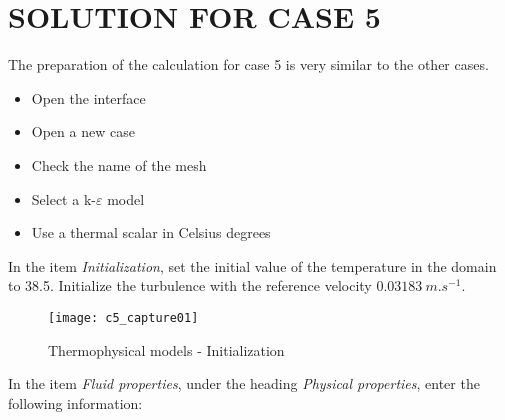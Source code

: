 %
%
%
%
%
%
%
\section{SOLUTION FOR CASE 5}
The preparation of the calculation for case 5 is very similar to the other cases.
\begin{itemize}
        \item Open the \CS interface
        \item Open a new case
        \item Check the name of the mesh
        \item Select a k-$\varepsilon$ model
        \item Use a thermal scalar in Celsius degrees
\end{itemize}

In the item {\itshape Initialization}, set the initial value of the temperature
in the domain to 38.5\degresC. Initialize the turbulence with the reference
velocity $0.03183\ m.s^{-1}$.

\begin{figure}[h!]
\begin{center}
\texttt{[image: c5\_capture01]}
\caption{Thermophysical models - Initialization}
\label{fig1_e5}
\end{center}
\end{figure}


\newpage
In the item {\itshape Fluid properties}, under the heading {\itshape Physical
properties}, enter the following information:

